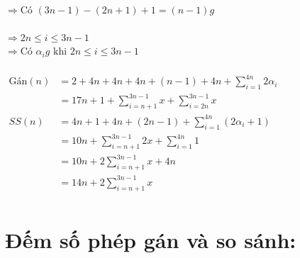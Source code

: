 \documentclass[12pt, letterpaper]{article}
\begin{document}
{{{ \\
$\Rightarrow \text{Có } (3n - 1) - (2n + 1) + 1 = (n - 1)g$ \\
 \\
$\Rightarrow 2n \leq i \leq 3n - 1$ \\
$\Rightarrow \text{Có } \alpha_ig \text{ khi }  2n \leq i \leq 3n - 1$\\
 \\
$ \begin{aligned}
    \text{Gán}(n) & = 2 + 4n + 4n + 4n + (n - 1) + 4n + \sum^{4n}_{i = 1} 2 \alpha_i \\
        & = 17n + 1 + \sum^{3n-1}_{i = n + 1} x + \sum^{3n-1}_{i = 2n} x\\
    SS(n) & = 4n + 1 + 4n + (2n - 1) + \sum^{4n}_{i = 1} (2 \alpha_i + 1) \\
        & = 10n + \sum^{3n-1}_{i = n + 1} 2x + \sum^{4n}_{i = 1} 1 \\
        & = 10n + 2 \sum^{3n-1}_{i = n + 1} x + 4n \\
        & = 14n + 2 \sum^{3n-1}_{i = n + 1} x \\
\end{aligned} $ \\

\section{Đếm số phép gán và so sánh:}

}}}
\end{document}
